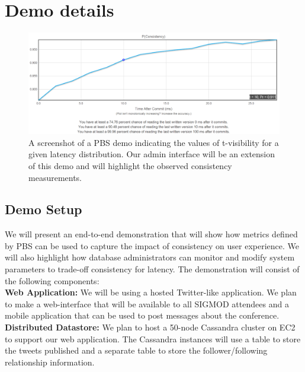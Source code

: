 \section{Demo details}
\label{sec:demo}

\begin{figure}
\centering
\includegraphics[width=.90\columnwidth]{figs/pbs-demo-screenshot.pdf}
\caption{A screenshot of a PBS demo indicating the values of t-visibility for a
given latency distribution. Our admin interface will be an extension of this
demo and will highlight the observed consistency measurements.}
\label{fig:pbs-demo-screenshot}
\end{figure}



\subsection{Demo Setup}
We will present an end-to-end demonstration that will show how metrics defined
by PBS can be used to capture the impact of consistency on user experience. We
will also highlight how database administrators can monitor and modify system
parameters to trade-off consistency for latency. The demonstration will consist
of the following components:\\


\textbf{Web Application:} We will be using a hosted Twitter-like application. We
plan to make a web-interface that will be available to all SIGMOD attendees and
a mobile application that can be used to post messages about the conference.\\

\textbf{Distributed Datastore:} We plan to host a 50-node Cassandra cluster on
EC2 to support our web application. The Cassandra instances will use a table to
store the tweets published and a separate table to store the follower/following
relationship information.\\

